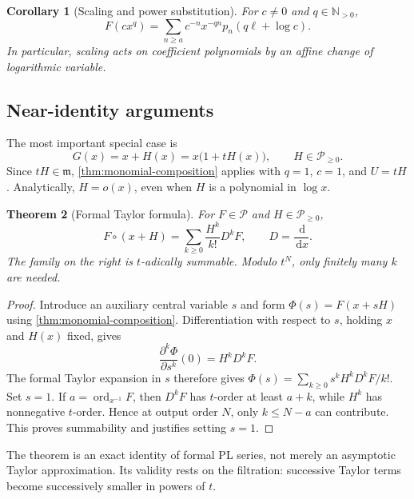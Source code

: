 \documentclass[11pt,oneside]{article}
\numberwithin{equation}{section}
\newtheorem{theorem}{Theorem}[section]
\newtheorem{corollary}[theorem]{Corollary}
\theoremstyle{definition}
\newcommand{\N}{\mathbb N}
\newcommand{\PL}{\mathscr P}
\newcommand{\ordx}{\operatorname{ord}_{x^{-1}}}
\newcommand{\dd}{\,\mathrm d}
\begin{document}
\begin{corollary}[Scaling and power substitution]
For \(c\ne0\) and \(q\in\N_{>0}\),
\begin{equation}\label{eq:scale-composition}
  F(cx^q)=\sum_{n\ge a}c^{-n}x^{-qn}
             p_n(q\ell+\log c).
\end{equation}
In particular, scaling acts on coefficient polynomials by an affine change of
logarithmic variable.
\end{corollary}

\subsection{Near-identity arguments}

The most important special case is
\begin{equation}\label{eq:near-identity-G}
  G(x)=x+H(x)=x\bigl(1+tH(x)\bigr),
  \qquad H\in\PL_{\ge0}.
\end{equation}
Since \(tH\in\mathfrak m\), \cref{thm:monomial-composition} applies with
\(q=1\), \(c=1\), and \(U=tH\).  Analytically, \(H=o(x)\), even when
\(H\) is a polynomial in \(\log x\).

\begin{theorem}[Formal Taylor formula]\label{thm:formal-taylor}
For \(F\in\PL\) and \(H\in\PL_{\ge0}\),
\begin{equation}\label{eq:formal-taylor}
\boxed{
  F\circ(x+H)=\sum_{k\ge0}\frac{H^k}{k!}D^kF,
  \qquad D=\frac{\dd}{\dd x}.
}
\end{equation}
The family on the right is \(t\)-adically summable.  Modulo \(t^N\), only
finitely many \(k\) are needed.
\end{theorem}

\begin{proof}
Introduce an auxiliary central variable \(s\) and form
\(\Phi(s)=F(x+sH)\) using \cref{thm:monomial-composition}.  Differentiation with
respect to \(s\), holding \(x\) and \(H(x)\) fixed, gives
\[
  \frac{\partial^k\Phi}{\partial s^k}(0)=H^kD^kF.
\]
The formal Taylor expansion in \(s\) therefore gives
\(\Phi(s)=\sum_{k\ge0}s^kH^kD^kF/k!\).  Set \(s=1\).  If
\(a=\ordx F\), then \(D^kF\) has \(t\)-order at least \(a+k\), while
\(H^k\) has nonnegative \(t\)-order.  Hence at output order \(N\), only
\(k\le N-a\) can contribute.  This proves summability and justifies setting
\(s=1\).
\end{proof}

The theorem is an exact identity of formal PL series, not merely an asymptotic
Taylor approximation.  Its validity rests on the filtration: successive Taylor
terms become successively smaller in powers of \(t\).
\end{document}

